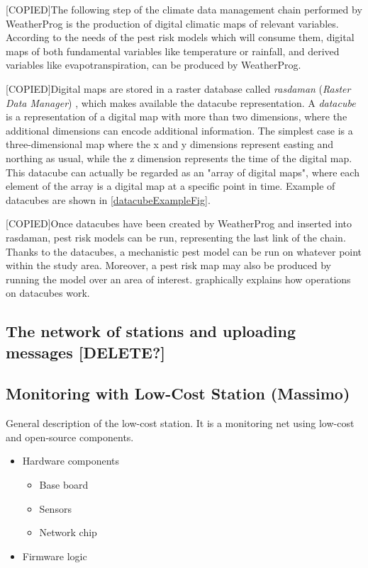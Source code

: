 \documentclass[authoryear,preprint,review,12pt]{elsarticle}
\begin{document}
[COPIED]The following step of the climate data management chain performed by WeatherProg is the production of digital climatic maps of relevant variables. According to the needs of the pest risk models which will consume them, digital maps of both fundamental variables like temperature or rainfall, and derived variables like evapotranspiration, can be produced by WeatherProg.

[COPIED]Digital maps are stored in a raster database called \emph{rasdaman} (\emph{Raster Data Manager}) \cite{baumann:rasdaman}, which makes  available the datacube representation. A \emph{datacube} is a representation of a digital map with more than two dimensions, where the additional dimensions can encode additional information. The simplest case is a three-dimensional map where the x and y dimensions represent easting and northing as usual, while the z dimension represents the time of the digital map. This datacube can actually be regarded as an "array of digital maps", where each element of the array is a digital map at a specific point in time. Example of datacubes are shown in \cref{datacubeExampleFig}.

[COPIED]Once datacubes have been created by WeatherProg and inserted into rasdaman, pest risk models can be run, representing the last link of the chain. Thanks to the datacubes, a mechanistic pest model can be run on whatever point within the study area. Moreover, a pest risk map may also be produced by running the model over an area of interest.  graphically explains how operations on datacubes work.

\subsection{The network of stations and uploading messages [DELETE?]}
\subsection{Monitoring with Low-Cost Station (Massimo)}
General description of the low-cost station.
It is a monitoring net using low-cost and open-source components.
\begin{itemize}
    \item Hardware components
    \begin{itemize}
        \item Base board
        \item Sensors
        \item Network chip
    \end{itemize}
    \item Firmware logic
\end{itemize}
\end{document}
